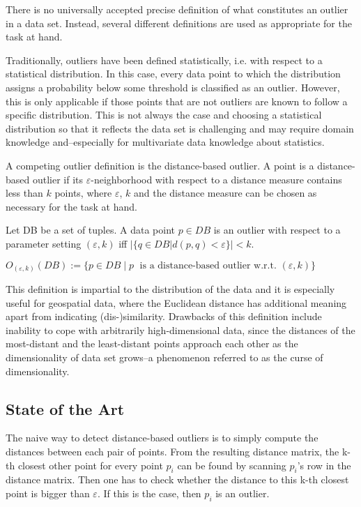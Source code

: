 \documentclass[runningheads]{llncs}
\begin{document}
There is no universally accepted precise definition of what constitutes an outlier in a data set. Instead, several different definitions are used as appropriate for the task at hand.

Traditionally, outliers have been defined statistically, i.e. with respect to a statistical distribution. In this case, every data point to which the distribution assigns a probability below some threshold is classified as an outlier. However, this is only applicable if those points that are not outliers are known to follow a specific distribution. This is not always the case and choosing a statistical distribution so that it reflects the data set is challenging and may require domain knowledge and--especially for multivariate data knowledge about statistics.

A competing outlier definition is the distance-based outlier. A point is a distance-based outlier if its $\varepsilon$-neighborhood with respect to a distance measure contains less than $k$ points, where $\varepsilon$, $k$ and the distance measure can be chosen as necessary for the task at hand.

\begin{definition}
    Let DB be a set of tuples. A data point $p\in DB$ is an outlier with respect to a parameter setting $(\varepsilon,k)$ iff 
    $|\{q \in DB | d(p,q) < \varepsilon\}| < k$.

    $O_{(\varepsilon,k)}(DB) := \{p\in DB \;| \;p\;\text{ is a distance-based outlier w.r.t. }(\varepsilon,k) \}$
\end{definition}

This definition is impartial to the distribution of the data and it is especially useful for geospatial data, where the Euclidean distance has additional meaning apart from indicating (dis-)similarity. Drawbacks of this definition include inability to cope with arbitrarily high-dimensional data, since the distances of the most-distant and the least-distant points approach each other as the dimensionality of data set grows--a phenomenon referred to as the curse of dimensionality. %

\subsection{State of the Art}

The naive way to detect distance-based outliers is to simply compute the distances between each pair of points. From the resulting distance matrix, the k-th closest other point for every point $p_i$ can be found by scanning $p_i$'s row in the distance matrix. Then one has to check whether the distance to this k-th closest point is bigger than $\varepsilon$. If this is the case, then $p_i$ is an outlier.
\end{document}
